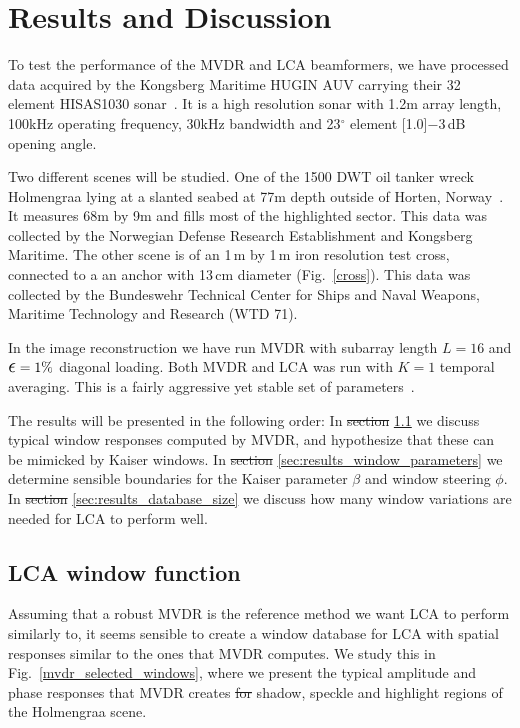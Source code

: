 \documentclass[10pt,journal,draftclsnofoot,onecolumn]{IEEEtran}
\newcommand\Fig[1]{Fig.~\ref{#1}}
\newcommand\1{\vec 1}
\newcommand\minus{\scalebox{0.75}[1.0]{$-$}}
\providecommand{\DIFadd}[1]{{\protect\color{blue}\uwave{#1}}} %
\providecommand{\DIFdel}[1]{{\protect\color{red}\sout{#1}}}                      %
\providecommand{\DIFaddbegin}{} %
\providecommand{\DIFaddend}{} %
\providecommand{\DIFdelbegin}{} %
\providecommand{\DIFdelend}{} %
\begin{document}
\section{Results and Discussion}\label{sec:results_discussion}

To test the performance of the MVDR and LCA beamformers, we have processed data acquired by the Kongsberg Maritime HUGIN AUV carrying their 32 element HISAS1030 sonar~\cite{Hansen2011}. It is a high resolution sonar with 1.2\;m array length, 100\;kHz operating frequency, 30\;kHz bandwidth and 23$^\circ$ element \minus{}3\,dB opening angle.

Two different scenes will be studied. One of the 1500 DWT oil tanker wreck Holmengraa lying at a slanted seabed at 77\;m depth outside of Horten, Norway~\cite{holmengraa}. It measures 68\;m by 9\;m and fills most of the highlighted sector. This data was collected by the Norwegian Defense Research Establishment and Kongsberg Maritime. The other scene is of an 1\,m by 1\,m iron resolution test cross, connected to a an anchor with 13\,cm diameter (\Fig{cross}). This data was collected by the Bundeswehr Technical Center for Ships and Naval Weapons, Maritime Technology and Research (WTD 71).

In the image reconstruction we have run MVDR with subarray length $L=16$ and $\text{\large$\epsilon$}=1\%$ diagonal loading. Both MVDR and LCA was run with $K=1$ temporal averaging. This is a fairly aggressive yet stable set of parameters~\cite{Synnevag2009a}.

The results will be presented in the following order: In \DIFdelbegin \DIFdel{section }\DIFdelend \DIFaddbegin \DIFadd{Section }\DIFaddend \ref{sec:results_lca_window_function} we discuss typical window responses computed by MVDR, and hypothesize that these can be mimicked by Kaiser windows. In \DIFdelbegin \DIFdel{section }\DIFdelend \DIFaddbegin \DIFadd{Section }\DIFaddend \ref{sec:results_window_parameters} we determine sensible boundaries for the Kaiser parameter $\beta$ and window steering $\phi$. In \DIFdelbegin \DIFdel{section }\DIFdelend \DIFaddbegin \DIFadd{Section }\DIFaddend \ref{sec:results_database_size} we discuss how many window variations are needed for LCA to perform well. 

\subsection{LCA window function}\label{sec:results_lca_window_function}

Assuming that a robust MVDR is the reference method we want LCA to perform similarly to, it seems sensible to create a window database for LCA with spatial responses similar to the ones that MVDR computes. We study this in \Fig{mvdr_selected_windows}, where we present the typical amplitude and phase responses \DIFaddbegin \DIFadd{for the windows }\DIFaddend that MVDR creates \DIFdelbegin \DIFdel{for }\DIFdelend \DIFaddbegin \DIFadd{in }\DIFaddend shadow, speckle and highlight regions of the Holmengraa scene.
\end{document}
